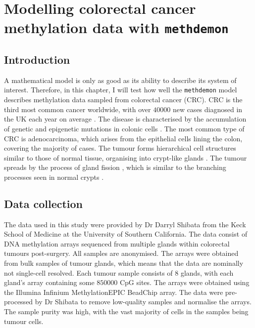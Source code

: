 \chapter{Modelling colorectal cancer methylation data with \texttt{methdemon}}
\label{chapter:methylation}

\section{Introduction}
A mathematical model is only as good as its ability to describe its system of
interest. Therefore, in this chapter, I will test how well the
\texttt{methdemon} model describes methylation data sampled from colorectal
cancer (CRC). CRC is the third most common cancer worldwide, with over $40000$
new cases diagnosed in the UK each year on average
\cite{cancer_research_uk_bowel_2021}. The disease is characterised by the
accumulation of genetic and epigenetic mutations in colonic cells
\cite{fleming_colorectal_2012}. The most common type of CRC is adenocarcinoma,
which arises from the epithelial cells lining the colon, covering the majority
of cases. The tumour forms hierarchical cell structures similar to those of
normal tissue, organising into crypt-like glands
\cite{ponz_de_leon_pathology_2001}. The tumour spreads by the process of gland
fission \cite{preston_bottom-up_nodate}, which is similar to the branching
processes seen in normal crypts \cite{almet_multicellular_2018}.

\section{Data collection}
The data used in this study were provided by Dr Darryl Shibata from the Keck
School of Medicine at the University of Southern California. The data consist
of DNA methylation arrays sequenced from multiple glands within colorectal
tumours post-surgery. All samples are anonymised. The arrays were obtained from
bulk samples of tumour glands, which means that the data are nominally not
single-cell resolved. Each tumour sample consists of $8$ glands, with each
gland's array containing some $850000$ CpG sites. The arrays were obtained
using the Illumina Infinium MethylationEPIC BeadChip array. The data were
pre-processed by Dr Shibata to remove low-quality samples and normalise the
arrays. The sample purity was high, with the vast majority of cells in the
samples being tumour cells.

